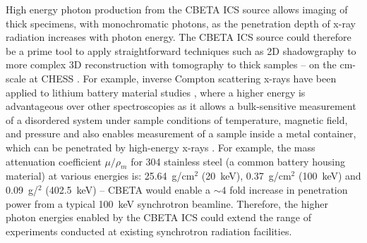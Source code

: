 \documentclass[../main.tex]{subfiles}
\begin{document}
High energy photon production from the CBETA ICS source allows imaging of thick specimens, with monochromatic photons, as the penetration depth of x-ray radiation increases with photon energy. The CBETA ICS source could therefore be a prime tool to apply straightforward techniques such as 2D shadowgraphy  to more complex 3D reconstruction with tomography \cite{als2011elements} to thick samples -- on the \si{\centi\meter}-scale at CHESS \cite{miller2017insitmu}.  For example, inverse Compton scattering x-rays have been applied to lithium battery material studies \cite{suzuki2015extracting,suzuki2016non,suzuki2019high}, where a higher energy is advantageous over other spectroscopies as it
allows a bulk-sensitive measurement of a disordered system
under sample conditions of temperature, magnetic field,
and pressure and also enables measurement of a sample inside a metal
container, which can be penetrated by high-energy x-rays \cite{suzuki2015extracting}. For example, the mass attenuation coefficient $\mu/\rho_{m}$ for 304 stainless steel \cite{thyssenkrupp2021steel} (a common battery housing material) at various energies is: 25.64~\si{\gram}/\si{\centi\meter}$^{2}$ (20~\si{\kilo\electronvolt}), 0.37~\si{\gram}/\si{\centi\meter}$^{2}$ (100~\si{\kilo\electronvolt}) and 0.09~\si{\gram}/\si{\centimeter}$^{2}$ (402.5~\si{\kilo\electronvolt}) \cite{berger1999xcom} -- CBETA would enable a $\sim 4$ fold increase in penetration power from a typical 100~\si{\kilo\electronvolt} synchrotron beamline. Therefore, the higher photon energies enabled by the CBETA ICS could extend the range of experiments conducted at existing synchrotron radiation facilities.
\end{document}
